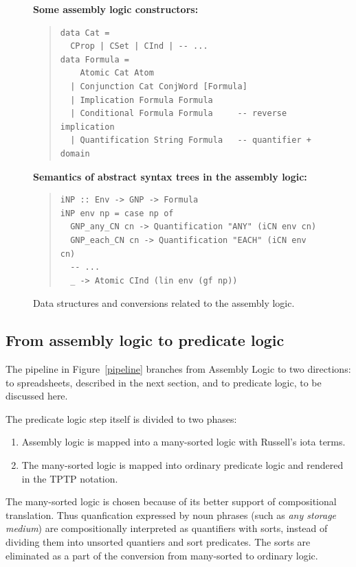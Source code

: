 \documentclass{IOS-Book-Article}
\newcommand{\bequ}{\begin{quote}}
\newcommand{\enqu}{\end{quote}}
\begin{document}
\begin{figure}
  \begin{framed}

 \textbf{Some assembly logic constructors:}
 \bequ
\begin{verbatim}
data Cat =
  CProp | CSet | CInd | -- ...
data Formula =
    Atomic Cat Atom
  | Conjunction Cat ConjWord [Formula]
  | Implication Formula Formula
  | Conditional Formula Formula     -- reverse implication
  | Quantification String Formula   -- quantifier + domain
\end{verbatim}
 \enqu

 \textbf{Semantics of abstract syntax trees in the assembly logic:}
 \bequ
\begin{verbatim}
iNP :: Env -> GNP -> Formula
iNP env np = case np of
  GNP_any_CN cn -> Quantification "ANY" (iCN env cn)
  GNP_each_CN cn -> Quantification "EACH" (iCN env cn)
  -- ...
  _ -> Atomic CInd (lin env (gf np))
\end{verbatim}
 \enqu

   \end{framed}
 \caption{Data structures and conversions related to the assembly logic.
 }
\label{assembly}
\end{figure}



\subsection{From assembly logic to predicate logic}

The pipeline in Figure~\ref{pipeline} branches from Assembly Logic to two directions: to spreadsheets, described in the next section, and to predicate logic, to be discussed here.

The predicate logic step itself is divided to two phases:
\begin{enumerate}
\item Assembly logic is mapped into a many-sorted logic with Russell's iota terms.
\item The many-sorted logic is mapped into ordinary predicate logic and rendered in the TPTP notation.
\end{enumerate}
The many-sorted logic is chosen because of its better support of compositional translation.
Thus quanfication expressed by noun phrases (such as \textit{any storage medium}) are compositionally interpreted as quantifiers with sorts, instead of dividing them into unsorted quantiers and sort predicates.
The sorts are eliminated as a part of the conversion from many-sorted to ordinary logic.
\end{document}

